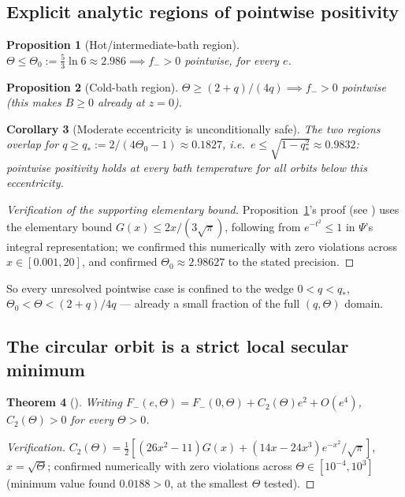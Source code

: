 \documentclass[12pt]{amsart}
\theoremstyle{plain}
\newtheorem{theorem}{Theorem}[section]
\newtheorem{proposition}[theorem]{Proposition}
\newtheorem{corollary}[theorem]{Corollary}
\theoremstyle{remark}
\begin{document}
\subsection{Explicit analytic regions of pointwise positivity}

\begin{proposition}[Hot/intermediate-bath region]\label{prop:hotbath}
$\Theta\leq\Theta_0:=\tfrac53\ln6\approx2.986\implies f_->0$ pointwise, for every $e$.
\end{proposition}

\begin{proposition}[Cold-bath region]\label{prop:coldbath}
$\Theta\geq(2+q)/(4q)\implies f_->0$ pointwise (this makes $B\geq0$ already at $z=0$).
\end{proposition}

\begin{corollary}[Moderate eccentricity is unconditionally safe]\label{cor:safe_ecc}
The two regions overlap for $q\geq q_*:=2/(4\Theta_0-1)\approx0.1827$, i.e.\ $e\leq\sqrt{1-q_*^2}\approx0.9832$: pointwise positivity holds at \emph{every} bath temperature for all orbits below this eccentricity.
\end{corollary}

\begin{proof}[Verification of the supporting elementary bound]
Proposition~\ref{prop:hotbath}'s proof (see \cite{EbertAuditedSecular2026}) uses the elementary bound $G(x)\leq2x/(3\sqrt\pi)$, following from $e^{-t^2}\leq1$ in $\Psi$'s integral representation; we confirmed this numerically with zero violations across $x\in[0.001,20]$, and confirmed $\Theta_0\approx2.98627$ to the stated precision.
\end{proof}

So every unresolved pointwise case is confined to the wedge $0<q<q_*$, $\Theta_0<\Theta<(2+q)/4q$ --- already a small fraction of the full $(q,\Theta)$ domain.

\subsection{The circular orbit is a strict local secular minimum}

\begin{theorem}[\cite{EbertAuditedSecular2026}]\label{thm:circularmin}
Writing $F_-(e,\Theta)=F_-(0,\Theta)+C_2(\Theta)e^2+O(e^4)$, $C_2(\Theta)>0$ for every $\Theta>0$.
\end{theorem}

\begin{proof}[Verification]
$C_2(\Theta)=\tfrac12[(26x^2-11)G(x)+(14x-24x^3)e^{-x^2}/\sqrt\pi]$, $x=\sqrt\Theta$; confirmed numerically with zero violations across $\Theta\in[10^{-4},10^3]$ (minimum value found $0.0188>0$, at the smallest $\Theta$ tested).
\end{proof}
\end{document}
